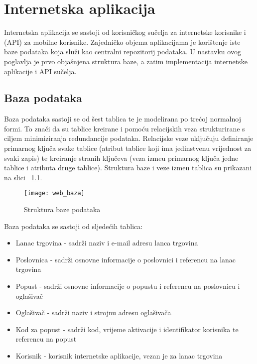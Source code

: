 
\chapter{Internetska aplikacija}

Internetska aplikacija se sastoji od korisni\v{c}kog su\v{c}elja za internetske korisnike i (API) za mobilne korisnike. Zajedni\v{c}ko objema aplikacijama je kori\v{s}tenje iste baze podataka koja slu\v{z}i kao centralni repozitorij podataka. U nastavku ovog poglavlja je prvo obja\v{s}njena struktura baze, a zatim implementacija internetske aplikacije i API su\v{c}elja.

\section{Baza podataka}

Baza podataka sastoji se od \v{s}est tablica te je modelirana po tre\'{c}oj normalnoj formi. To zna\v{c}i da su tablice kreirane i pomo\'{c}u relacijskih veza strukturirane s ciljem minimiziranja redundancije podataka. Relacijske veze uklju\v{c}uju definiranje primarnog klju\v{c}a svake tablice (atribut tablice koji ima jedinstvenu vrijednost za svaki zapis) te kreiranje stranih klju\v{c}eva (veza izme\dj u primarnog klju\v{c}a jedne tablice i atributa druge tablice). Struktura baze i veze izme\dj u tablica su prikazani na slici ~\ref{fig:bazaPodataka}.


\begin{figure}[!htbp]
	\begin{center}
 \texttt{[image: web\_baza]}
 \caption{Struktura baze podataka}
 \label{fig:bazaPodataka}
	\end{center}
\end{figure}

Baza podataka se sastoji od sljede\'{c}ih tablica:
\begin{itemize}
	\item Lanac trgovina - sadr\v{z}i naziv i e-mail adresu lanca trgovina
	\item Poslovnica - sadr\v{z}i osnovne informacije o poslovnici i referencu na lanac trgovina
	\item Popust - sadr\v{z}i osnovne informacije o popustu i referencu na poslovnicu i ogla\v{s}iva\v{c}
	\item Ogla\v{s}iva\v{c} - sadr\v{z}i naziv i strojnu adresu ogla\v{s}iva\v{c}a
	\item Kod za popust - sadr\v{z}i kod, vrijeme aktivacije i identifikator korisnika te referencu na popust
	\item Korisnik - korisnik internetske aplikacije, vezan je za lanac trgovina
\end{itemize}



